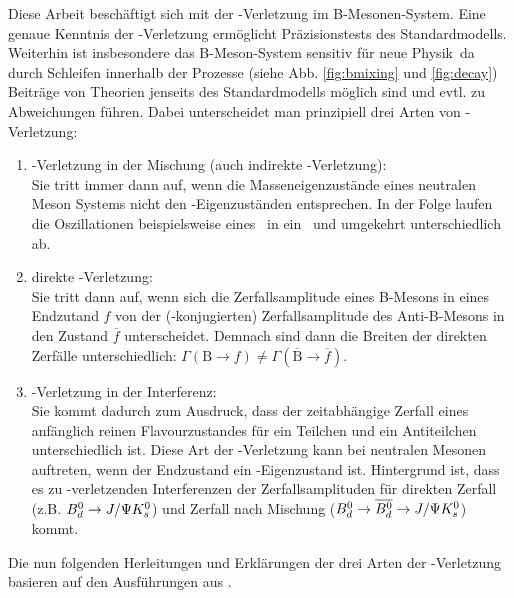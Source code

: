 Diese Arbeit beschäftigt sich mit der \CP-Verletzung im B-Mesonen-System. Eine genaue Kenntnis der \CP-Verletzung ermöglicht Präzisionstests des Standardmodells. Weiterhin ist insbesondere das B-Meson-System sensitiv für \glqq neue Physik\grqq\, da durch Schleifen innerhalb der Prozesse (siehe Abb. \ref{fig:bmixing} und \ref{fig:decay}) Beiträge von Theorien jenseits des Standardmodells möglich sind und evtl. zu Abweichungen führen. Dabei unterscheidet man prinzipiell drei Arten von \CP-Verletzung:
\begin{enumerate}
\item \CP-Verletzung in der Mischung (auch indirekte \CP-Verletzung): \\
      Sie tritt immer dann auf, wenn die Masseneigenzustände eines neutralen Meson Systems nicht den \CP-Eigenzuständen entsprechen. In der Folge laufen die Oszillationen beispielsweise eines \Bd\ in ein \Bdbar\ und umgekehrt unterschiedlich ab.
\item direkte \CP-Verletzung: \\
      Sie tritt dann auf, wenn sich die Zerfallsamplitude eines B-Mesons in eines Endzutand $f$ von der (\CP-konjugierten) Zerfallsamplitude des Anti-B-Mesons in den Zustand $\overline{f}$ unterscheidet. Demnach sind dann die Breiten der direkten Zerfälle unterschiedlich: $\Gamma (\text{B} \rightarrow f) \neq \Gamma (\overline{\text{B}} \rightarrow \overline{f})$.
\item \CP-Verletzung in der Interferenz: \\
      Sie kommt dadurch zum Ausdruck, dass der zeitabhängige Zerfall eines anfänglich reinen Flavourzustandes für ein Teilchen und ein Antiteilchen unterschiedlich ist. Diese Art der \CP-Verletzung kann bei neutralen Mesonen auftreten, wenn der Endzustand ein \CP-Eigenzustand ist. Hintergrund ist, dass es zu \CP-verletzenden Interferenzen der Zerfallsamplituden für direkten Zerfall (z.B. $\text{$B_d^0$} \rightarrow J/\Psi K_s^0$) und Zerfall nach Mischung ($\text{$B_d^0$} \rightarrow \text{$\overline{B_d^0}$} \rightarrow J/\Psi K_s^0$) kommt.
\end{enumerate}
Die nun folgenden Herleitungen und Erklärungen der drei Arten der \CP-Verletzung basieren auf den Ausführungen aus \cite{kleinknecht}.

